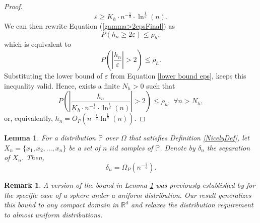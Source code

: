 \documentclass{article}
\newtheorem{lemma}{Lemma}
\newtheorem{remark}{Remark}
\begin{document}
\begin{proof}
\begin{equation}
    \varepsilon \geq K_h\cdot n^{-\frac{1}{d}}\cdot \ln ^\frac{1}{d}(n).
    \label{lower bound eps}
\end{equation}
We can then rewrite Equation (\ref{gamma>2epsFinal}) as
\begin{equation*}
    P(h_n\geq 2 \varepsilon)\leq\rho_h,
\end{equation*}
which is equivalent to
\begin{equation*}
    P\left(\left|\frac{h_n}{\varepsilon}\right|>2\right)\leq\rho_h.
\end{equation*}
Substituting the lower bound of $\varepsilon$ from Equation \eqref{lower bound eps}, keeps this inequality valid. Hence, exists a finite $N_h>0$ such that
\begin{equation*}
    P\left(\left|\frac{h_n}{K_h\cdot n^{-\frac{1}{d}}\cdot \ln ^\frac{1}{d}(n)}\right|>2\right)\leq\rho_h ,\,\, \forall n>N_h,
\end{equation*}
or, equivalently, $h_n = O_P(n^{-\frac{1}{d}} \ln ^{\frac{1}{d}}(n))$. 
\end{proof}

\begin{lemma}
For a distribution $\mathbb{P}$ over $\Omega$ that satisfies Definition \ref{NicelyDef}, let $X_n=\{x_1,x_2,...,x_n\}$ be a set of $n$ $iid$ samples of $\mathbb{P}$. Denote by $\delta_n$ the separation of $X_n$. Then, 
         \begin{equation}
            \delta_n = \Omega_P(n^{-\frac{2}{d}}).
         \end{equation} 
\label{Order in probability of delta_n}
\end{lemma}

\begin{remark}
    A version of the bound in Lemma \ref{Order in probability of delta_n} was previously established by \cite{brauchart2018random} for the specific case of a sphere under a uniform distribution. Our result generalizes this bound to any compact domain in $\mathbb{R}^d$ and relaxes the distribution requirement to almost uniform distributions.
\end{remark}
\end{document}
